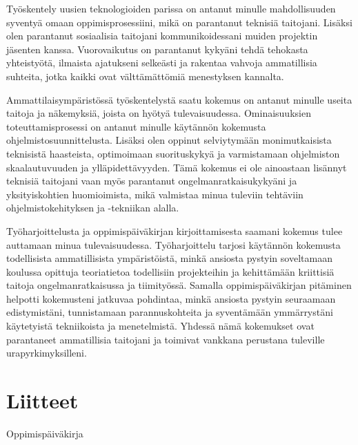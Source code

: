 \documentclass[11pt,a4paper,titlepage,oneside]{article}
\begin{document}
Työskentely uusien teknologioiden parissa on antanut minulle mahdollisuuden syventyä omaan oppimisprosessiini, 
mikä on parantanut teknisiä taitojani.
Lisäksi olen parantanut sosiaalisia taitojani kommunikoidessani muiden projektin jäsenten kanssa.
Vuorovaikutus on parantanut kykyäni tehdä tehokasta yhteistyötä,
ilmaista ajatukseni selkeästi ja rakentaa vahvoja ammatillisia suhteita,
jotka kaikki ovat välttämättömiä menestyksen kannalta. \\
\medskip



Ammattilaisympäristössä työskentelystä saatu kokemus on antanut minulle useita taitoja ja näkemyksiä, 
joista on hyötyä tulevaisuudessa.
Ominaisuuksien toteuttamisprosessi on antanut minulle käytännön kokemusta ohjelmistosuunnittelusta. 
Lisäksi olen oppinut selviytymään monimutkaisista teknisistä haasteista,
optimoimaan suorituskykyä ja varmistamaan ohjelmiston skaalautuvuuden ja ylläpidettävyyden.
Tämä kokemus ei ole ainoastaan lisännyt teknisiä taitojani vaan myös parantanut ongelmanratkaisukykyäni ja yksityiskohtien huomioimista, 
mikä valmistaa minua tuleviin tehtäviin ohjelmistokehityksen ja -tekniikan alalla.

\medskip




%
Työharjoittelusta ja oppimispäiväkirjan kirjoittamisesta saamani kokemus tulee auttamaan minua tulevaisuudessa.
Työharjoittelu tarjosi käytännön kokemusta todellisista ammatillisista ympäristöistä,
minkä ansiosta pystyin soveltamaan koulussa opittuja teoriatietoa todellisiin projekteihin ja kehittämään kriittisiä taitoja 
ongelmanratkaisussa ja tiimityössä.
Samalla oppimispäiväkirjan pitäminen helpotti kokemusteni jatkuvaa pohdintaa,
minkä ansiosta pystyin seuraamaan edistymistäni,
tunnistamaan parannuskohteita ja syventämään ymmärrystäni käytetyistä tekniikoista ja menetelmistä.
Yhdessä nämä kokemukset ovat parantaneet ammatillisia taitojani ja toimivat vankkana perustana tuleville urapyrkimyksilleni.
\medskip


















\newpage









\section*{Liitteet}               %

Oppimispäiväkirja




\end{document}
